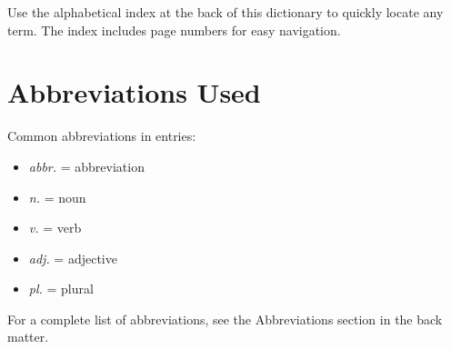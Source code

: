 Use the alphabetical index at the back of this dictionary to quickly locate any term. The index includes page numbers for easy navigation.

\section*{Abbreviations Used}

Common abbreviations in entries:
\begin{itemize}
    \item \textit{abbr.} = abbreviation
    \item \textit{n.} = noun
    \item \textit{v.} = verb
    \item \textit{adj.} = adjective
    \item \textit{pl.} = plural
\end{itemize}

For a complete list of abbreviations, see the Abbreviations section in the back matter.
